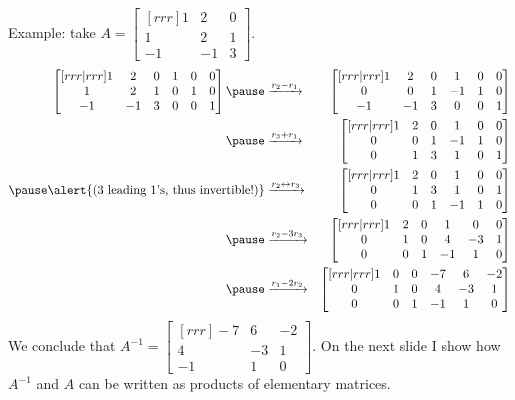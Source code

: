 \begin{frame}\scriptsize
\alert{Example:} take $A=\begin{bmatrix}[rrr]
1&2&0\\
1&2&1\\
-1&-1&3
\end{bmatrix}. $
\begin{eqnarray*}
\begin{bmatrix}[rrr|rrr]
1&2&0&1&0&0\\
1&2&1&0&1&0\\
-1&-1&3&0&0&1
\end{bmatrix}
\pause&\xrightarrow{r_2-r_1}&\begin{bmatrix}[rrr|rrr]
1&2&0&1&0&0\\
0&0&1&-1&1&0\\
-1&-1&3&0&0&1
\end{bmatrix} \\
\pause&\xrightarrow{r_3+r_1}&\begin{bmatrix}[rrr|rrr]
1&2&0&1&0&0\\
0&0&1&-1&1&0\\
0&1&3&1&0&1
\end{bmatrix} \\
\pause\alert{\text{(3 leading 1's, thus invertible!)}}&\xrightarrow{r_2\leftrightarrow r_3}&\begin{bmatrix}[rrr|rrr]
1&2&0&1&0&0\\
0&1&3&1&0&1\\
0&0&1&-1&1&0
\end{bmatrix} \\
\pause&\xrightarrow{r_2-3r_3}&\begin{bmatrix}[rrr|rrr]
1&2&0&1&0&0\\
0&1&0&4&-3&1\\
0&0&1&-1&1&0
\end{bmatrix} \\
\pause&\xrightarrow{r_1-2r_2}&\begin{bmatrix}[rrr|rrr]
1&0&0&-7&6&-2\\
0&1&0&4&-3&1\\
0&0&1&-1&1&0
\end{bmatrix}
\end{eqnarray*}
\pause We conclude that $A^{-1}=\begin{bmatrix}[rrr]
-7&6&-2\\
4&-3&1\\
-1&1&0
\end{bmatrix}$. On the next slide I show how $A^{-1}$ and $A$ can be written as products of elementary matrices. 
\end{frame}

